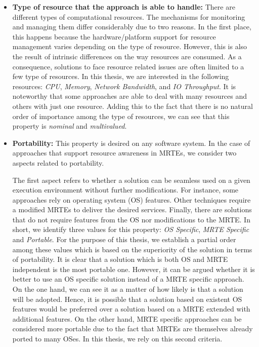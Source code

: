 \begin{itemize}
\item\textbf{Type of resource that the approach is able to handle:}
There are different types of computational resources.
The mechanisms for monitoring and managing them differ considerably due to two reasons.
In the first place, this happens because the hardware/platform support for resource management varies depending on the type of resource.
However, this is also the result of intrinsic differences on the way resources are consumed.
As a consequence, solutions to face resource related issues are often limited to a few type of resources.
In this thesis, we are interested in the following resources: \textit{CPU}, \textit{Memory}, \textit{Network Bandwidth}, and \textit{IO Throughput}.
It is noteworthy that some approaches are able to deal with many resources and others with just one resource.
Adding this to the fact that there is no natural order of importance among the type of resources, we can see that this property is \textit{nominal} and \textit{multivalued}.  

\item \textbf{Portability:}
This property is desired on any software system.
In the case of approaches that support resource awareness in MRTEs, we consider two aspects related to portability.

The first aspect refers to whether a solution can be seamless used on a given execution environment without further modifications.
For instance, some approaches rely on operating system (OS) features.
Other techniques require a modified MRTEs to deliver the desired services.
Finally, there are solutions that do not require features from the OS nor modifications to the MRTE.
In short, we identify three values for this property: \textit{OS Specific}, \textit{MRTE Specific} and \textit{Portable}.
For the purpose of this thesis, we establish a partial order among these values which is based on the superiority of the solution in terms of portability.
It is clear that a solution which is both OS and MRTE independent is the most portable one.
However, it can be argued whether it is better to use an OS specific solution instead of a MRTE specific approach.        
On the one hand, we can see it as a matter of how likely is that a solution will be adopted. 
Hence, it is possible that a solution based on existent OS features would be preferred over a solution based on a MRTE extended with additional features.
On the other hand, MRTE specific approaches can be considered more portable due to the fact that MRTEs are themselves already ported to many OSes.
In this thesis, we rely on this second criteria.


\end{itemize}
